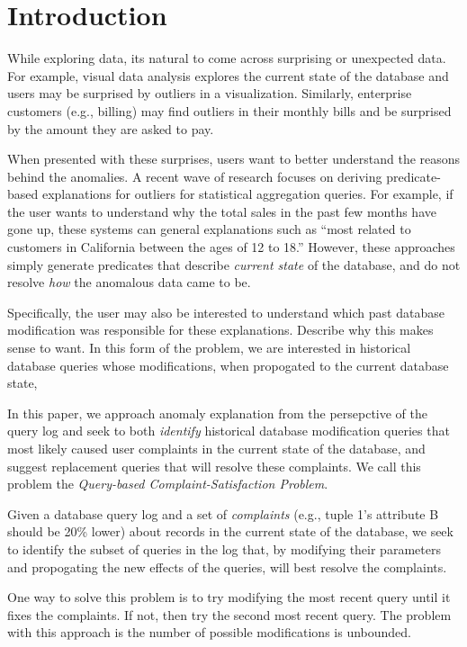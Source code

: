 
\section{Introduction}
\label{s:intro}


While exploring data, its natural to come across surprising or unexpected data.
For example, visual data analysis explores the current state of the database and users may be surprised by outliers in a visualization.
Similarly, enterprise customers (e.g., billing) may find outliers in their monthly bills and be surprised by the amount they are asked to pay.

When presented with these surprises, users want to better understand the reasons behind the anomalies.
A recent wave of research focuses on deriving predicate-based explanations for outliers for statistical aggregation queries.
For example, if the user wants to understand why the total sales in the past few months have gone up, these systems can general explanations such as ``most related to customers in California between the ages of 12 to 18.''
However, these approaches simply generate predicates that describe {\it current state} of the database, and do not resolve {\it how} the anomalous data came to be.

Specifically, the user may also be interested to understand which past database modification was responsible for these explanations.
Describe why this makes sense to want.  In this form of the problem, we are interested in historical database queries whose modifications, when propogated to the current database state, 


In this paper, we approach anomaly explanation from the persepctive of the query log and seek to
both {\it identify}  historical database modification queries that most likely caused user complaints 
in the current state of the database, and suggest replacement queries that will resolve these complaints.
We call this problem the {\it Query-based Complaint-Satisfaction Problem}.

Given a database query log and a set of {\it complaints} (e.g., tuple 1's attribute B should be 20\% lower) about records in the current state of the database,
we seek to identify the subset of queries in the log that, by modifying their parameters and propogating the new effects of the queries, 
will best resolve the complaints.  

One way to solve this problem is to try modifying the most recent query until it fixes the complaints.  
If not, then try the second most recent query.  
The problem with this approach is the number of possible modifications is unbounded.

